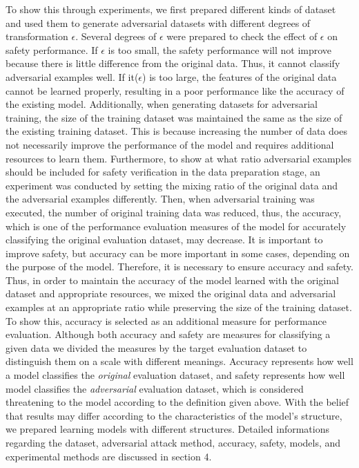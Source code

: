 \documentclass[journal,article,submit,moreauthors,pdftex]{Definitions/mdpi}
\begin{document}
To show this through experiments, we first prepared different kinds of dataset and used them to generate adversarial datasets with different degrees of transformation \begin{math}\epsilon\end{math}.
Several degrees of \begin{math}\epsilon\end{math} were prepared to check the effect of \begin{math}\epsilon\end{math} on safety performance. If \begin{math}\epsilon\end{math} is too small, the safety performance will not improve because there is little difference from the original data. Thus, it cannot classify adversarial examples well. If it(\begin{math}\epsilon\end{math}) is too large, the features of the original data cannot be learned properly, resulting in a poor performance like the accuracy of the existing model.
Additionally, when generating datasets for adversarial training, the size of the training dataset was maintained the same as the size of the existing training dataset.
This is because increasing the number of data does not necessarily improve the performance of the model and requires additional resources to learn them.
Furthermore, to show at what ratio adversarial examples should be included for safety verification in the data preparation stage, an experiment was conducted by setting the mixing ratio of the original data and the adversarial examples differently.
Then, when adversarial training was executed, the number of original training data was reduced, thus, the accuracy, which is one of the performance evaluation measures of the model for accurately classifying the original evaluation dataset, may decrease\cite{trade-off}. 
It is important to improve safety, but accuracy can be more important in some cases, depending on the purpose of the model.
Therefore, it is necessary to ensure accuracy and safety. 
Thus, in order to maintain the accuracy of the model learned with the original dataset and appropriate resources, we mixed the original data and adversarial examples at an appropriate ratio while preserving the size of the training dataset.
To show this, accuracy is selected as an additional measure for performance evaluation.
Although both accuracy and safety are measures for classifying a given data we divided the measures by the target evaluation dataset to distinguish them on a scale with different meanings.
Accuracy represents how well a model classifies the {\it original} evaluation dataset, and safety represents how well model classifies the {\it adversarial} evaluation dataset, which is considered threatening to the model according to the definition given above.
With the belief that results may differ according to the characteristics of the model's structure, we prepared learning models with different structures. 
Detailed informations regarding the dataset, adversarial attack method, accuracy, safety, models, and experimental methods are discussed in section 4.
\end{document}
